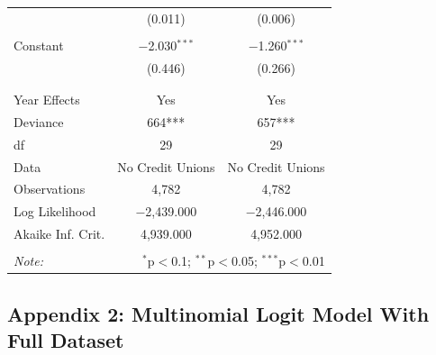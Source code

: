 \documentclass[a4paper, nobind]{templates/ociamthesis}
\begin{document}
\begin{table}[!htbp]
\begin{tabular}{@{\extracolsep{5pt}}lcc}
  & (0.011) & (0.006) \\ 
  & & \\ 
 Constant & $-$2.030$^{***}$ & $-$1.260$^{***}$ \\ 
  & (0.446) & (0.266) \\ 
  & & \\ 
\hline \\[-1.8ex] 
Year Effects & Yes & Yes \\ 
Deviance & 664*** & 657*** \\ 
df & 29 & 29 \\ 
Data & No Credit Unions & No Credit Unions \\ 
Observations & 4,782 & 4,782 \\ 
Log Likelihood & $-$2,439.000 & $-$2,446.000 \\ 
Akaike Inf. Crit. & 4,939.000 & 4,952.000 \\ 
\hline 
\hline \\[-1.8ex] 
\textit{Note:}  & \multicolumn{2}{r}{$^{*}$p$<$0.1; $^{**}$p$<$0.05; $^{***}$p$<$0.01} \\ 
\end{tabular} 
\end{table}

\newpage

\hypertarget{appendix-2-multinomial-logit-model-with-full-dataset}{%
\subsection{Appendix 2: Multinomial Logit Model With Full Dataset}\label{appendix-2-multinomial-logit-model-with-full-dataset}}
\end{document}
